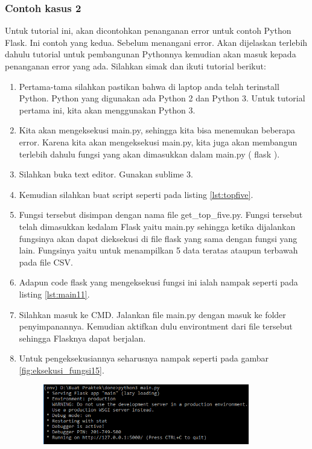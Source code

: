 \subsubsection{Contoh kasus 2}
Untuk tutorial ini, akan dicontohkan penanganan error untuk contoh Python Flask. Ini contoh yang kedua. Sebelum menangani error. Akan dijelaskan terlebih dahulu tutorial untuk pembangunan Pythonnya kemudian akan masuk kepada penanganan error yang ada. Silahkan simak dan ikuti tutorial berikut:
\begin{enumerate}
\item Pertama-tama silahkan pastikan bahwa di laptop anda telah terinstall Python. Python yang digunakan ada Python 2 dan Python 3. Untuk tutorial pertama ini, kita akan menggunakan Python 3.
\item Kita akan mengeksekusi main.py, sehingga kita bisa menemukan beberapa error. Karena kita akan mengeksekusi main.py, kita juga akan membangun terlebih dahulu fungsi yang akan dimasukkan dalam main.py ( flask ).
\item Silahkan buka text editor. Gunakan sublime 3.
\item Kemudian silahkan buat script seperti pada listing \ref{lst:topfive}.

\item Fungsi tersebut disimpan dengan nama file get\_top\_five.py. Fungsi tersebut telah dimasukkan kedalam Flask yaitu main.py sehingga ketika dijalankan fungsinya akan dapat dieksekusi di file flask yang sama dengan fungsi yang lain. Fungsinya yaitu untuk menampilkan 5 data teratas ataupun terbawah pada file CSV.
\item Adapun code flask yang mengeksekusi fungsi ini ialah nampak seperti pada listing \ref{lst:main11}.

\item Silahkan masuk ke CMD. Jalankan file main.py dengan masuk ke folder penyimpanannya. Kemudian aktifkan dulu environtment dari file tersebut sehingga Flasknya dapat berjalan.
\item Untuk pengeksekusiannya seharusnya nampak seperti pada gambar \ref{fig:eksekusi_fungsi15}.
\begin{figure}[!htbp]
	\centerline{\includegraphics[width=0.85\textwidth]{figures/8/eksekusi_fungsi15.png}}

\end{figure}
\end{enumerate}
